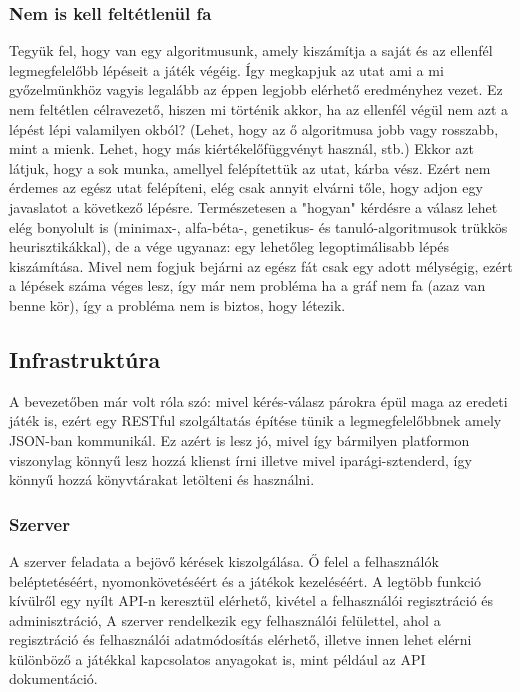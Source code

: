 \documentclass[twoside, a4paper, 12pt]{article}
\begin{document}
\subsubsection{Nem is kell feltétlenül fa}
Tegyük fel, hogy van egy algoritmusunk, amely kiszámítja a saját és az ellenfél legmegfelelőbb lépéseit a játék végéig. Így megkapjuk az utat ami a mi győzelmünkhöz vagyis legalább az éppen legjobb elérhető eredményhez vezet. Ez nem feltétlen célravezető, hiszen mi történik akkor, ha az ellenfél végül nem azt a lépést lépi valamilyen okból? (Lehet, hogy az ő algoritmusa jobb vagy rosszabb, mint a mienk. Lehet, hogy más kiértékelőfüggvényt használ, stb.) Ekkor azt látjuk, hogy a sok munka, amellyel felépítettük az utat, kárba vész. Ezért nem érdemes az egész utat felépíteni, elég csak annyit elvárni tőle, hogy adjon egy javaslatot a következő lépésre. Természetesen a "hogyan" kérdésre a válasz lehet elég bonyolult is (minimax-, alfa-béta-, genetikus- és tanuló-algoritmusok trükkös heurisztikákkal), de a vége ugyanaz: egy lehetőleg legoptimálisabb lépés kiszámítása. Mivel nem fogjuk bejárni az egész fát csak egy adott mélységig, ezért a lépések száma véges lesz, így már nem probléma ha a gráf nem fa (azaz van benne kör), így a probléma nem is biztos, hogy létezik.

\subsection{Infrastruktúra}
A bevezetőben már volt róla szó: mivel kérés-válasz párokra épül maga az eredeti játék is, ezért egy RESTful szolgáltatás építése tünik a legmegfelelőbbnek amely JSON-ban kommunikál. Ez azért is lesz jó, mivel így bármilyen platformon viszonylag könnyű lesz hozzá klienst írni illetve mivel iparági-sztenderd, így könnyű hozzá könyvtárakat letölteni és használni.

\subsubsection{Szerver}
A szerver feladata a bejövő kérések kiszolgálása. Ő felel a felhasználók beléptetéséért, nyomonkövetéséért és a játékok kezeléséért. A legtöbb funkció kívülről egy nyílt API-n keresztül elérhető, kivétel a felhasználói regisztráció és adminisztráció,
A szerver rendelkezik egy felhasználói felülettel, ahol a regisztráció és felhasználói adatmódosítás elérhető, illetve innen lehet elérni különböző a játékkal kapcsolatos anyagokat is, mint például az API dokumentáció.
\end{document}
